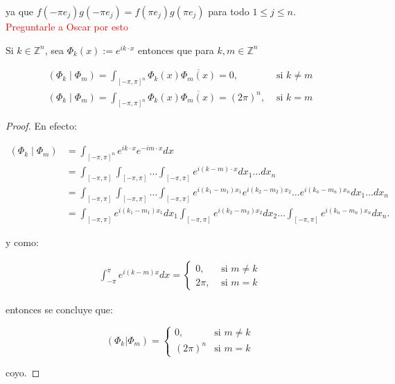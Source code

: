 \documentclass[12pt]{article}
\begin{document}
ya que $f(-\pi e_j)g(-\pi e_j)=f(\pi e_j)g(\pi e_j)$ para todo $1\leq j\leq n$.\\

\textcolor{red}{Preguntarle a Oscar por esto}

\begin{theorem}
Si $k \in \mathbb{Z}^n$, sea $\Phi_k(x):=e^{i k \cdot x}$ entonces que para $k, m \in \mathbb{Z}^n$

$$
\begin{array}{ll}
\displaystyle\left(\Phi_k \mid \Phi_m\right)=\int_{[-\pi, \pi]^n} \Phi_k(x) \overline{\Phi_m(x)}=0, & \text { si } k \neq m \\
\displaystyle\left(\Phi_k \mid \Phi_m\right)=\int_{[-\pi, \pi]^n} \Phi_k(x) \overline{\Phi_m(x)}=(2 \pi)^n, & \text { si } k=m
\end{array}
$$
\end{theorem}

\begin{proof}
En efecto:

\begin{align*}
    \left(\Phi_k \mid \Phi_m\right)&=\int_{[-\pi,\pi]^n}e^{ik \cdot x}e^{-im\cdot x}dx\\
    &=\int_{[-\pi,\pi]}\int_{[-\pi,\pi]}\ldots \int_{[-\pi,\pi]}e^{i(k-m) \cdot x}dx_1\ldots dx_n\\
    &=\int_{[-\pi,\pi]}\int_{[-\pi,\pi]}\ldots \int_{[-\pi,\pi]}e^{i(k_1-m_1) x_1}e^{i(k_2-m_2) x_2}\ldots e^{i(k_n-m_n) x_n}dx_1\ldots dx_n\\
    &=\int_{[-\pi,\pi]}e^{i(k_1-m_1) x_1}dx_1\int_{[-\pi,\pi]}e^{i(k_2-m_2) x_2}dx_2\ldots \int_{[-\pi,\pi]} e^{i(k_n-m_n) x_n}dx_n
.\end{align*}

y como:

$$
\begin{aligned}
\int_{-\pi}^\pi e^{i(k-m)x} d x= \begin{cases}0, & \text { si } m \neq k \\
2 \pi, & \text { si } m=k\end{cases}
\end{aligned}
$$

entonces se concluye que:

$$(\Phi_k|\Phi_m)=\begin{cases}
0, \quad &\text{si } m\neq k\\
(2\pi)^n &\text{si } m=k
\end{cases}$$


coyo.
\end{proof}
\end{document}
